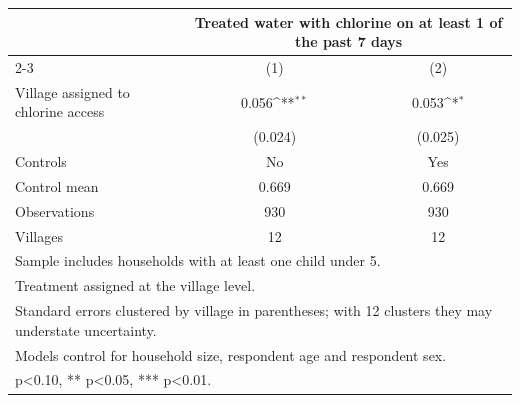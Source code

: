 {
\def\sym#1{\ifmmode^{#1}\else\(^{#1}\)\fi}
\begin{tabular}{l*{2}{c}}
\toprule
                    &\multicolumn{2}{c}{Treated water with chlorine on at least 1 of the past 7 days}\\\cmidrule(lr){2-3}
                    &\multicolumn{1}{c}{(1)}         &\multicolumn{1}{c}{(2)}         \\
\midrule
Village assigned to chlorine access&       0.056\sym{**} &       0.053\sym{*}  \\
                    &     (0.024)         &     (0.025)         \\
\midrule
Controls            &          No         &         Yes         \\
Control mean        &       0.669         &       0.669         \\
Observations        &         930         &         930         \\
Villages            &          12         &          12         \\
\bottomrule
\multicolumn{3}{l}{\footnotesize Sample includes households with at least one child under 5.}\\
\multicolumn{3}{l}{\footnotesize Treatment assigned at the village level.}\\
\multicolumn{3}{l}{\footnotesize Standard errors clustered by village in parentheses; with 12 clusters they may understate uncertainty.}\\
\multicolumn{3}{l}{\footnotesize Models control for household size, respondent age and respondent sex.}\\
\multicolumn{3}{l}{\footnotesize * p<0.10, ** p<0.05, *** p<0.01.}\\
\end{tabular}
}
